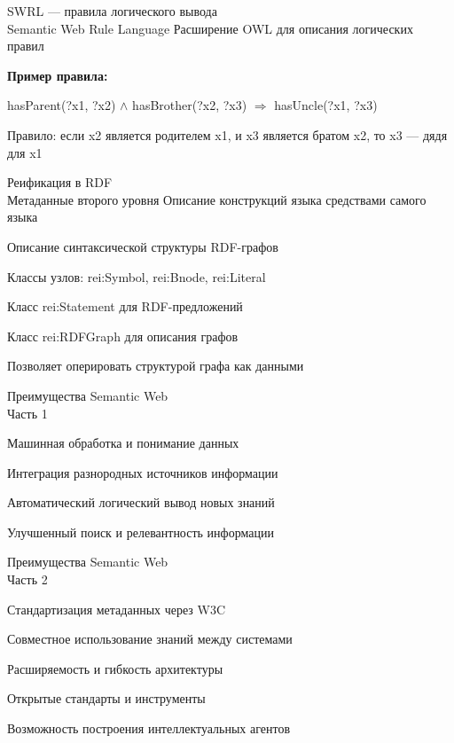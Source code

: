 \begin{frame}{SWRL --- правила логического вывода\\Semantic Web Rule Language}
	\topline
	\justifying
	Расширение OWL для описания логических правил
	
	\vspace{0.5cm}
	\textbf{Пример правила:}
	
	hasParent(?x1, ?x2) $\land$ hasBrother(?x2, ?x3) $\Rightarrow$ hasUncle(?x1, ?x3)
	
	\vspace{0.5cm}
	Правило: если x2 является родителем x1, и x3 является братом x2, то x3 --- дядя для x1
\end{frame}

\begin{frame}{Реификация в RDF\\Метаданные второго уровня}
	\topline
	\justifying
	Описание конструкций языка средствами самого языка
	
	\begin{textitemize}
		\item Описание синтаксической структуры RDF-графов
		\item Классы узлов: rei:Symbol, rei:Bnode, rei:Literal
		\item Класс rei:Statement для RDF-предложений
		\item Класс rei:RDFGraph для описания графов
	\end{textitemize}
	
	Позволяет оперировать структурой графа как данными
\end{frame}

\begin{frame}{Преимущества Semantic Web\\Часть 1}
	\topline
	\justifying
	\begin{textitemize}
		\item Машинная обработка и понимание данных
		\item Интеграция разнородных источников информации
		\item Автоматический логический вывод новых знаний
		\item Улучшенный поиск и релевантность информации
	\end{textitemize}
\end{frame}

\begin{frame}{Преимущества Semantic Web\\Часть 2}
	\topline
	\justifying
	\begin{textitemize}
		\item Стандартизация метаданных через W3C
		\item Совместное использование знаний между системами
		\item Расширяемость и гибкость архитектуры
		\item Открытые стандарты и инструменты
		\item Возможность построения интеллектуальных агентов
	\end{textitemize}
\end{frame}

